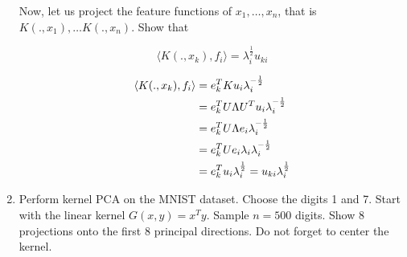 \documentclass{article}
\begin{document}
\begin{enumerate}
        Now, let us project the feature functions of $x_1,\ldots,x_n$, that is $K(.,x_1), \ldots K(.,x_n)$. Show that 

        \[\langle K(.,x_k),f_i \rangle = \lambda_i^\frac{1}{2} u_{ki}\]

        \begin{equation} 
            \begin{aligned}
                \langle K(.,x_k), f_i\rangle &= e_k^TKu_i\lambda_i^{-\frac{1}{2}} \notag \\
                &= e_k^T U \Lambda U^Tu_i\lambda_i^{-\frac{1}{2}} \\
                &= e_k^T U \Lambda e_i\lambda_i^{-\frac{1}{2}} \\
                &= e_k^T U e_i \lambda_i \lambda_i^{-\frac{1}{2}} \\
                &= e_k^T u_i \lambda_i^{\frac{1}{2}} = u_{ki} \lambda_i^{\frac{1}{2}}
            \end{aligned}
        \end{equation}
    
    \item Perform kernel PCA on the MNIST dataset. Choose the digits 1 and 7. 
    Start with the linear kernel $G(x,y)=x^Ty$. Sample $n=500$ digits. Show 8 
    projections onto the first 8 principal directions. Do not forget to center the 
    kernel. 

    \vspace{0.5cm}
    \vspace{0.5cm}


\end{enumerate}
\end{document}
